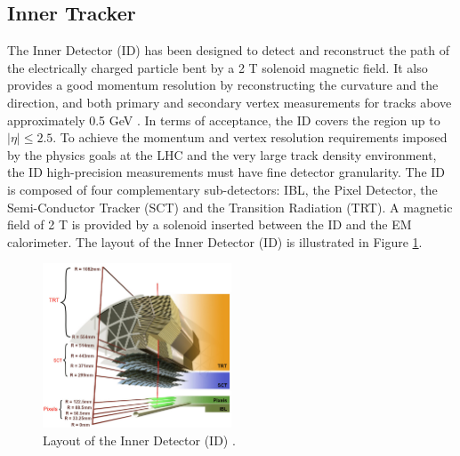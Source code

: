 \subsection{Inner Tracker}
\label{chap2:ATLAS:ITk}
The Inner Detector (ID) has been designed to detect and reconstruct the path of the electrically charged particle bent by a 2 T solenoid magnetic field. It also provides a good momentum resolution by reconstructing the curvature and the direction, and both primary and secondary vertex measurements for tracks above approximately 0.5 GeV \cite{ID_TRD, TrkVertexing}. In terms of acceptance, the ID covers the region up to $|\eta|\leqslant2.5$. To achieve the momentum and vertex resolution requirements imposed by the physics goals at the LHC and the very large track density environment, the ID high-precision measurements must have fine detector granularity. The ID is composed of four complementary sub-detectors: IBL, the Pixel Detector, the Semi-Conductor Tracker (SCT) and the Transition Radiation (TRT). A magnetic field of 2 T is provided by a solenoid inserted between the ID and the EM calorimeter. The layout of the Inner Detector (ID) is illustrated in Figure \ref{fig:chap2:ATLAS:ITK:ID}.
\begin{figure}[htbp]
    \centering
    \includegraphics[width=0.5\textwidth]{Ch2/Img/ID_withIBL.png}
    \caption{Layout of the Inner Detector (ID) \cite{ID_withIBL}.}
    \label{fig:chap2:ATLAS:ITK:ID}
\end{figure}

